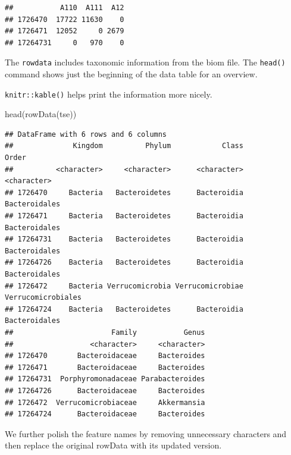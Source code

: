 \documentclass[
]{book}
\newenvironment{Shaded}{\begin{snugshade}}{\end{snugshade}}
\newcommand{\FunctionTok}[1]{\textcolor[rgb]{0.00,0.00,0.00}{#1}}
\newcommand{\NormalTok}[1]{#1}
\begin{document}
\begin{verbatim}
##           A110  A111  A12
## 1726470  17722 11630    0
## 1726471  12052     0 2679
## 17264731     0   970    0
\end{verbatim}

The \texttt{rowdata} includes taxonomic information from the biom file. The \texttt{head()} command shows just the beginning of the data table for an overview.

\texttt{knitr::kable()} helps print the information more nicely.

\begin{Shaded}
\begin{Highlighting}[]
\FunctionTok{head}\NormalTok{(}\FunctionTok{rowData}\NormalTok{(tse))}
\end{Highlighting}
\end{Shaded}

\begin{verbatim}
## DataFrame with 6 rows and 6 columns
##              Kingdom          Phylum            Class              Order
##          <character>     <character>      <character>        <character>
## 1726470     Bacteria   Bacteroidetes      Bacteroidia      Bacteroidales
## 1726471     Bacteria   Bacteroidetes      Bacteroidia      Bacteroidales
## 17264731    Bacteria   Bacteroidetes      Bacteroidia      Bacteroidales
## 17264726    Bacteria   Bacteroidetes      Bacteroidia      Bacteroidales
## 1726472     Bacteria Verrucomicrobia Verrucomicrobiae Verrucomicrobiales
## 17264724    Bacteria   Bacteroidetes      Bacteroidia      Bacteroidales
##                       Family           Genus
##                  <character>     <character>
## 1726470       Bacteroidaceae     Bacteroides
## 1726471       Bacteroidaceae     Bacteroides
## 17264731  Porphyromonadaceae Parabacteroides
## 17264726      Bacteroidaceae     Bacteroides
## 1726472  Verrucomicrobiaceae     Akkermansia
## 17264724      Bacteroidaceae     Bacteroides
\end{verbatim}

We further polish the feature names by removing unnecessary characters and then replace the original rowData with its updated version.
\end{document}

